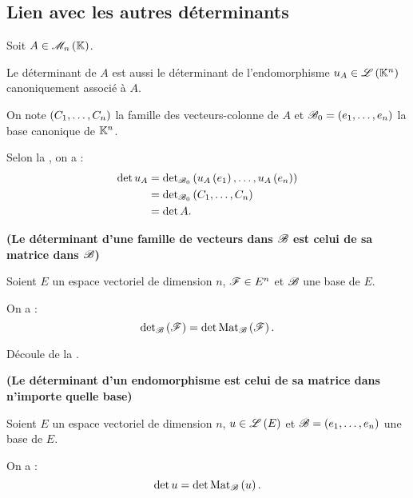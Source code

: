 \subsection{Lien avec les autres déterminants}

\begin{prop}
Soit \(A\in\M{n}\).

Le déterminant de \(A\) est aussi le déterminant de l'endomorphisme \(u_A\in\mathscr{L}\left(\mathbb{K}^n\right)\) canoniquement associé à \(A\).
\end{prop}

\begin{dem}
On note \(\left(C_1,\dots,C_n\right)\) la famille des vecteurs-colonne de \(A\) et \(\mathscr{B}_0=\left(e_1,\dots,e_n\right)\) la base canonique de \(\mathbb{K}^n\).

Selon la , on a : \[\begin{aligned}
\det u_A&=\detb[\fami{B}_0]\paren{u_A\paren{e_1},\dots,u_A\paren{e_n}} \\
&=\detb[\fami{B}_0]\paren{C_1,\dots,C_n} \\
&=\det A.
\end{aligned}\]
\end{dem}

\begin{prop}
{\normalfont\bfseries (Le déterminant d'une famille de vecteurs dans \(\mathscr{B}\) est celui de sa matrice dans \(\mathscr{B}\))}

Soient \(E\) un espace vectoriel de dimension \(n\), \(\mathscr{F}\in E^n\) et \(\mathscr{B}\) une base de \(E\).

On a : \[\detb\paren{\fami{F}}=\det\Mat{\fami{F}}.\]
\end{prop}

\begin{dem}
Découle de la .
\end{dem}

\begin{prop}
{\normalfont\bfseries (Le déterminant d'un endomorphisme est celui de sa matrice dans n'importe quelle base)}

Soient \(E\) un espace vectoriel de dimension \(n\), \(u\in\mathscr{L}\left(E\right)\) et \(\mathscr{B}=\left(e_1,\dots,e_n\right)\) une base de \(E\).

On a : \[\det u=\det\Mat{u}.\]
\end{prop}

